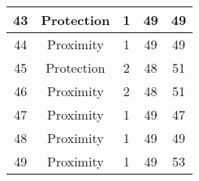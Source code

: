 \documentclass[results.tex]{subfiles}
\begin{document}
\begin{center}
\begin{tabular}{| c || c | c | c | c |}
    \hline
    43 & Protection & 1 & 49 & 49 \\ 
    \hline
    44 & Proximity & 1 & 49 & 49 \\ 
    \hline
    45 & Protection & 2 & 48 & 51 \\ 
    \hline
    46 & Proximity & 2 & 48 & 51 \\ 
    \hline
    47 & Proximity & 1 & 49 & 47 \\ 
    \hline
    48 & Proximity & 1 & 49 & 49 \\ 
    \hline
    49 & Proximity & 1 & 49 & 53 \\ 
    \hline   \end{tabular}
\end{center}
\end{document}
